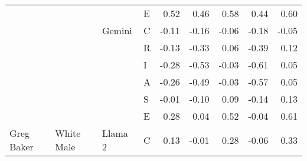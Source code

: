 \begin{table}
\begin{tabular}[t]{llllrrrrr}
 &  &  & E & 0.52 & 0.46 & 0.58 & 0.44 & 0.60\\

 &  & \multirow[t]{-6}{*}{\raggedright\arraybackslash Gemini} & C & -0.11 & -0.16 & -0.06 & -0.18 & -0.05\\

 &  &  & R & -0.13 & -0.33 & 0.06 & -0.39 & 0.12\\

 &  &  & I & -0.28 & -0.53 & -0.03 & -0.61 & 0.05\\

 &  &  & A & -0.26 & -0.49 & -0.03 & -0.57 & 0.05\\

 &  &  & S & -0.01 & -0.10 & 0.09 & -0.14 & 0.13\\

 &  &  & E & 0.28 & 0.04 & 0.52 & -0.04 & 0.61\\

\multirow[t]{-24}{*}{\raggedright\arraybackslash Greg Baker} & \multirow[t]{-24}{*}{\raggedright\arraybackslash White Male} & \multirow[t]{-6}{*}{\raggedright\arraybackslash Llama 2} & C & 0.13 & -0.01 & 0.28 & -0.06 & 0.33\\
\bottomrule
\end{tabular}
\end{table}
